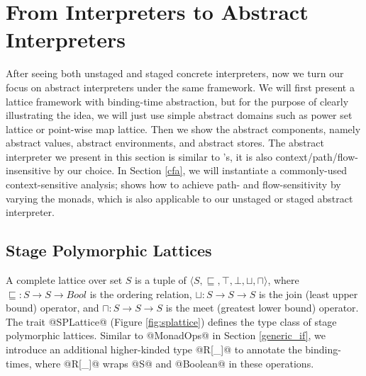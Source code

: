 \section{From Interpreters to Abstract Interpreters} \label{unstaged_abs}

After seeing both unstaged and staged concrete interpreters, now we turn our
focus on abstract interpreters under the same framework. We will first present a
lattice framework with binding-time abstraction, but for the purpose of clearly
illustrating the idea, we will just use simple abstract domains such as power set
lattice or point-wise map lattice. Then we show the abstract components, namely
abstract values, abstract environments, and abstract stores.
The abstract interpreter we present in this section is similar to
\citet{DBLP:journals/pacmpl/DaraisLNH17}'s, it is also
context/path/flow-insensitive by our choice.  In Section \ref{cfa}, we will
instantiate a commonly-used context-sensitive analysis;
\citet{Darais:2015:GTM:2814270.2814308} shows how to achieve path- and
flow-sensitivity by varying the monads, which is also applicable to our unstaged
or staged abstract interpreter.

\subsection{Stage Polymorphic Lattices} \label{stagedpoly_lat}

A complete lattice over set $S$ is a tuple of $\langle S, \sqsubseteq, \top,
\bot, \sqcup, \sqcap \rangle$, where $\sqsubseteq : S \to S \to Bool$ is the
ordering relation, $\sqcup: S \to S \to S$ is the join (least upper bound)
operator, and $\sqcap: S \to S \to S$ is the meet (greatest lower bound)
operator. The trait @SPLattice@ (Figure \ref{fig:splattice}) defines the type
class of stage polymorphic lattices. Similar to @MonadOps@ in Section
\ref{generic_if}, we introduce an additional higher-kinded type @R[_]@ to
annotate the binding-times, where @R[_]@ wraps @S@ and @Boolean@ in these
operations.

